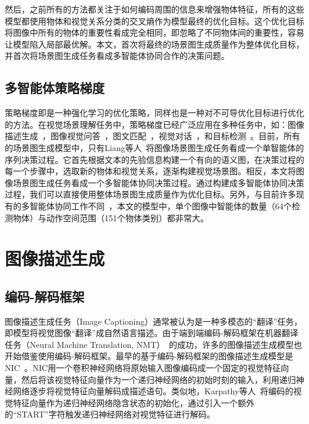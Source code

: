 然后，之前所有的方法都关注于如何编码周围的信息来增强物体特征，所有的这些模型都使用物体和视觉关系分类的交叉熵作为模型最终的优化目标。这个优化目标将图像中所有的物体的重要性看成完全相同，即忽略了不同物体间的重要性，容易让模型陷入局部最优解。本文，首次将最终的场景图生成质量作为整体优化目标，并首次将场景图生成任务看成多智能体协同合作的决策问题。

\subsection{多智能体策略梯度}

策略梯度即是一种强化学习的优化策略，同样也是一种对不可导优化目标进行优化的方法。在视觉场景理解任务中，策略梯度已经广泛应用在多种任务中，如：图像描述生成~\cite{ranzato2016sequence,ren2017deep,liu2017improved,rennie2017self,zhang2017actor,liu2018context}，图像视觉问答~\cite{hu2017learning,johnson2017inferring}，图文匹配~\cite{chen2017query,yu2017joint}，视觉对话~\cite{das2017learning}，和目标检测~\cite{caicedo2015active,mathe2016reinforcement,jie2016tree}。目前，所有的场景图生成模型中，只有Liang等人~\cite{liang2017deep}将图像场景图生成任务看成一个单智能体的序列决策过程。它首先根据文本的先验信息构建一个有向的语义图，在决策过程的每一个步骤中，选取新的物体和视觉关系，逐渐构建视觉场景图。相反，本文将图像场景图生成任务看成一个多智能体协同决策过程。通过构建成多智能体协同决策过程，我们可以直接使用整体场景图生成质量作为优化目标。另外，与目前许多现有的多智能体协同工作不同~\cite{foerster2016learning,omidshafiei2017deep}，本文的模型中，单个图像中智能体的数量（64个检测物体）与动作空间范围（151个物体类别）都非常大。


\section{图像描述生成}

\subsection{编码-解码框架}

图像描述生成任务（Image Captioning）通常被认为是一种多模态的“翻译”任务，即模型将视觉图像“翻译”成自然语言描述。由于端到端编码-解码框架在机器翻译任务（Neural Machine Translation, NMT）~\cite{sutskever2014sequence}的成功，许多的图像描述生成模型也开始借鉴使用编码-解码框架。最早的基于编码-解码框架的图像描述生成模型是NIC~\cite{vinyals2015show}。NIC用一个卷积神经网络将原始输入图像编码成一个固定的视觉特征向量，然后将该视觉特征向量作为一个递归神经网络的初始时刻的输入，利用递归神经网络逐步将视觉特征向量解码成描述语句。类似地，Karpathy等人~\cite{karpathy2015deep}将编码的视觉特征向量作为递归神经网络隐含状态的初始化，通过引入一个额外的“START”字符触发递归神经网络对视觉特征进行解码。

